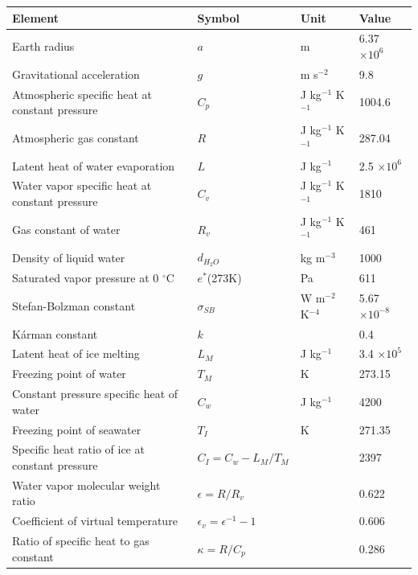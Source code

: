 \setlength\LTleft{0pt}\setlength\LTright{0pt}
\begin{longtable}[]{@{}llll@{}}
\toprule\relax
Element & Symbol & Unit & Value\tabularnewline
\midrule\relax
\endhead
Earth radius & \(a\) & m & 6.37 \(\times 10^6\)\tabularnewline
Gravitational acceleration & \(g\) & m s\(^{-2}\) & 9.8\tabularnewline
Atmospheric specific heat at constant pressure & \(C_p\) & J kg\(^{-1}\)
K\(^{-1}\) & 1004.6\tabularnewline
Atmospheric gas constant & \(R\) & J kg\(^{-1}\) K\(^{-1}\) &
287.04\tabularnewline
Latent heat of water evaporation & \(L\) & J kg\(^{-1}\) & 2.5
\(\times 10^6\)\tabularnewline
Water vapor specific heat at constant pressure & \(C_v\) & J kg\(^{-1}\)
K\(^{-1}\) & 1810\tabularnewline
Gas constant of water & \(R_v\) & J kg\(^{-1}\) K\(^{-1}\) &
461\tabularnewline
Density of liquid water & \(d_{H_2O}\) & kg m\(^{-3}\) &
1000\tabularnewline
Saturated vapor pressure at 0 \(^{\circ}\)C & \(e^*\)(273K) & Pa &
611\tabularnewline
Stefan-Bolzman constant & \(\sigma_{SB}\) & W m\(^{-2}\) K\(^{-4}\) &
5.67 \(\times 10^{-8}\)\tabularnewline
Kárman constant & \(k\) & & 0.4\tabularnewline
Latent heat of ice melting & \(L_M\) & J kg\(^{-1}\) & 3.4
\(\times 10^5\)\tabularnewline
Freezing point of water & \(T_M\) & K & 273.15\tabularnewline
Constant pressure specific heat of water & \(C_w\) & J kg\(^{-1}\) &
4200\tabularnewline
Freezing point of seawater & \(T_I\) & K & 271.35\tabularnewline
Specific heat ratio of ice at constant pressure &
\(C_I = C_w - L_M/T_M\) & & 2397\tabularnewline
Water vapor molecular weight ratio & \(\epsilon = R/R_v\) & &
0.622\tabularnewline
Coefficient of virtual temperature & \(\epsilon_v = \epsilon^{-1} - 1\)
& & 0.606\tabularnewline
Ratio of specific heat to gas constant & \(\kappa = R/C_p\) & &
0.286\tabularnewline
\bottomrule
\end{longtable}
